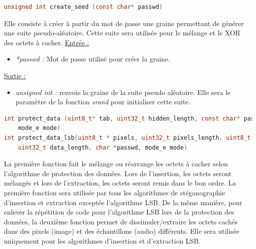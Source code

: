 \documentclass[11pt]{article}
\begin{document}
\begin{lstlisting}[language=c]
unsigned int create_seed (const char* passwd)
\end{lstlisting}

Elle consiste à créer à partir du mot de passe une graine permettant de 
générer une suite pseudo-aléatoire. Cette suite sera utilisée pour le 
mélange et le XOR des octets à cacher. 
\newline
\underline{Entrée :}
\begin{itemize}
\item \textit{*passwd :} Mot de passe utilisé pour créer la graine. 
\end{itemize}
\underline{Sortie :} 
\begin{itemize}
\item \textit{unsigned int :} renvoie la graine de la suite pseudo aléatoire.
Elle sera le paramètre de la fonction \textit{srand} pour initialiser cette 
suite.   
\newline 
\end{itemize}

\begin{lstlisting}[language=c]
int protect_data (uint8_t* tab, uint32_t hidden_length, const char* passwd, 
	mode_e mode)
int protect_data_lsb(uint8_t * pixels, uint32_t pixels_length, uint8_t * data, 
	uint32_t data_length, char *passwd, mode_e mode)
\end{lstlisting}

La première fonction fait le mélange ou réarrange les octets à cacher selon 
l'algorithme de protection des données. Lors de l'insertion, les octets seront 
mélangés et lors de l'extraction, les octets seront remis dans le bon ordre. 
La première fonction sera utilisée par tous les algorithmes de stéganographie 
d'insertion et extraction exceptée l'algorithme LSB.  
De la même manière, pour enlever la répétition de code pour l'algorithme 
LSB lors de la protection des données, la deuxième fonction permet de 
dissimuler/extraire les octets cachés dans des pixels (image) et des 
échantillons (audio) différents. Elle sera utilisée uniquement pour les 
algorithmes d'insertion et d'extraction LSB. 
\end{document}
